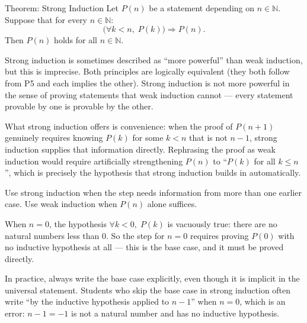 \begin{propositionbox}{Theorem: Strong Induction}
Let $P(n)$ be a statement depending on $n \in \mathbb{N}$.
Suppose that for every $n \in \mathbb{N}$:
\[
\Big(\forall k < n,\; P(k)\Big) \Rightarrow P(n).
\]
Then $P(n)$ holds for all $n \in \mathbb{N}$.
\end{propositionbox}

\begin{remark}
Strong induction is sometimes described as ``more powerful'' than weak
induction, but this is imprecise. Both principles are logically
equivalent (they both follow from P5 and each implies the other).
Strong induction is not more powerful in the sense of proving statements
that weak induction cannot --- every statement provable by one is
provable by the other.

What strong induction offers is convenience: when the proof of $P(n+1)$
genuinely requires knowing $P(k)$ for some $k < n$ that is not $n-1$,
strong induction supplies that information directly. Rephrasing the proof
as weak induction would require artificially strengthening $P(n)$ to
``$P(k)$ for all $k \leq n$'', which is precisely the hypothesis that
strong induction builds in automatically.

Use strong induction when the step needs information from more than one
earlier case. Use weak induction when $P(n)$ alone suffices.
\end{remark}

\begin{remark}
When $n = 0$, the hypothesis $\forall k < 0,\; P(k)$ is vacuously
true: there are no natural numbers less than $0$. So the step for
$n = 0$ requires proving $P(0)$ with no inductive hypothesis at all
--- this is the base case, and it must be proved directly.

In practice, always write the base case explicitly, even though it is
implicit in the universal statement. Students who skip the base case in
strong induction often write ``by the inductive hypothesis applied to
$n-1$'' when $n = 0$, which is an error: $n - 1 = -1$ is not a natural
number and has no inductive hypothesis.
\end{remark}

